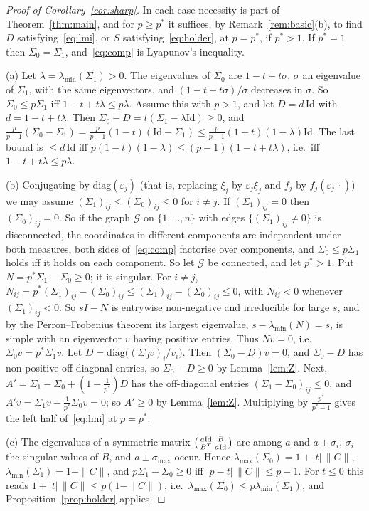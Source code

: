 \documentclass[11pt]{amsart}
\theoremstyle{definition}
\newcommand{\Id}{\mathrm{Id}}
\begin{document}
\begin{proof}[Proof of Corollary~\ref{cor:sharp}]
In each case necessity is part of Theorem~\ref{thm:main}, and for $p\ge p^*$ it suffices, by
Remark~\ref{rem:basic}(b), to find $D$ satisfying~\eqref{eq:lmi}, or $S$ satisfying~\eqref{eq:holder}, at
$p=p^*$, if $p^*>1$. If $p^*=1$ then $\Sigma_0=\Sigma_1$, and~\eqref{eq:comp} is Lyapunov's inequality.

(a) Let $\lambda=\lambda_{\min}(\Sigma_1)>0$. The eigenvalues of $\Sigma_0$ are $1-t+t\sigma$, $\sigma$ an eigenvalue
of $\Sigma_1$, with the same eigenvectors, and $(1-t+t\sigma)/\sigma$ decreases in $\sigma$. So $\Sigma_0\le p\Sigma_1$
iff $1-t+t\lambda\le p\lambda$. Assume this with $p>1$, and let $D=d\,\Id$ with $d=1-t+t\lambda$. Then
$\Sigma_0-D=t(\Sigma_1-\lambda\Id)\ge0$, and $\frac p{p-1}(\Sigma_0-\Sigma_1)=\frac p{p-1}(1-t)(\Id-\Sigma_1)
\le\frac p{p-1}(1-t)(1-\lambda)\Id$. The last bound is $\le d\,\Id$ iff
$p(1-t)(1-\lambda)\le(p-1)(1-t+t\lambda)$, i.e.\ iff $1-t+t\lambda\le p\lambda$.

(b) Conjugating by $\mathrm{diag}(\varepsilon_j)$ (that is, replacing $\xi_j$ by $\varepsilon_j\xi_j$ and $f_j$ by
$f_j(\varepsilon_j\,\cdot)$) we may assume $(\Sigma_1)_{ij}\le(\Sigma_0)_{ij}\le0$ for $i\ne j$. If
$(\Sigma_1)_{ij}=0$ then $(\Sigma_0)_{ij}=0$. So if the graph $\mathcal G$ on $\{1,\dots,n\}$ with edges
$\{(\Sigma_1)_{ij}\ne0\}$ is disconnected, the coordinates in different components are independent under both
measures, both sides of~\eqref{eq:comp} factorise over components, and $\Sigma_0\le p\Sigma_1$ holds iff it holds on
each component. So let $\mathcal G$ be connected, and let $p^*>1$. Put $N=p^*\Sigma_1-\Sigma_0\ge0$; it is singular.
For $i\ne j$, $N_{ij}=p^*(\Sigma_1)_{ij}-(\Sigma_0)_{ij}\le(\Sigma_1)_{ij}-(\Sigma_0)_{ij}\le0$, with
$N_{ij}<0$ whenever $(\Sigma_1)_{ij}<0$. So $sI-N$ is entrywise non-negative and irreducible for large $s$, and by the
Perron--Frobenius theorem its largest eigenvalue, $s-\lambda_{\min}(N)=s$, is simple with an eigenvector $v$ having
positive entries. Thus $Nv=0$, i.e.\ $\Sigma_0v=p^*\Sigma_1v$. Let $D=\mathrm{diag}\big((\Sigma_0v)_i/v_i\big)$.
Then $(\Sigma_0-D)v=0$, and $\Sigma_0-D$ has non-positive off-diagonal entries, so $\Sigma_0-D\ge0$ by
Lemma~\ref{lem:Z}. Next, $A'=\Sigma_1-\Sigma_0+(1-\frac1{p^*})D$ has the off-diagonal entries
$(\Sigma_1-\Sigma_0)_{ij}\le0$, and $A'v=\Sigma_1v-\frac1{p^*}\Sigma_0v=0$; so $A'\ge0$ by Lemma~\ref{lem:Z}.
Multiplying by $\frac{p^*}{p^*-1}$ gives the left half of~\eqref{eq:lmi} at $p=p^*$.

(c) The eigenvalues of a symmetric matrix $\begin{psmallmatrix}a\Id&B\\B^T&a\Id\end{psmallmatrix}$ are among $a$ and
$a\pm\sigma_i$, $\sigma_i$ the singular values of $B$, and $a\pm\sigma_{\max}$ occur. Hence $\lambda_{\max}(\Sigma_0)=1+|t|\,\|C\|$,
$\lambda_{\min}(\Sigma_1)=1-\|C\|$, and $p\Sigma_1-\Sigma_0\ge0$ iff $|p-t|\,\|C\|\le p-1$. For $t\le0$ this reads
$1+|t|\,\|C\|\le p(1-\|C\|)$, i.e.\ $\lambda_{\max}(\Sigma_0)\le p\lambda_{\min}(\Sigma_1)$, and
Proposition~\ref{prop:holder} applies.
\end{proof}
\end{document}
